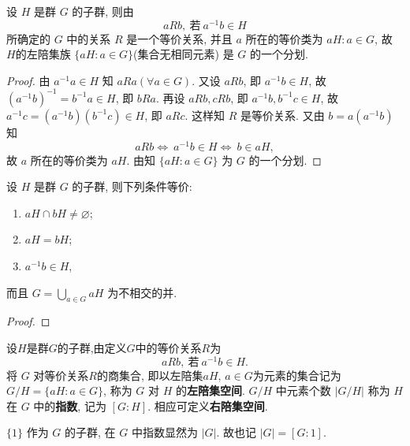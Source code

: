 \documentclass[../../main.tex]{subfiles}
\begin{document}
\begin{theorem}\label{theorem:抽象代数-定理 1.3.2}
设 \( H \) 是群 \( G \) 的子群, 则由
\[
aRb, \ \text{若} \ a^{-1}b \in H
\]
所确定的 \( G \) 中的关系 \( R \) 是一个等价关系, 并且 \( a \) 所在的等价类为 \( aH:a\in G \), 故 \( H \)的左陪集族 \( \{aH:a\in G\} \)(集合无相同元素) 是 \( G \) 的一个分划.
\end{theorem}
\begin{proof}
由 \( a^{-1}a \in H \) 知 \( aRa(\forall a \in G) \). 又设 \( aRb \), 即 \( a^{-1}b \in H \), 故 \( (a^{-1}b)^{-1} = b^{-1}a \in H \), 即 \( bRa \). 再设 \( aRb, cRb \), 即 \( a^{-1}b, b^{-1}c \in H \), 故 \( a^{-1}c = (a^{-1}b)(b^{-1}c) \in H \), 即 \( aRc \). 这样知 \( R \) 是等价关系. 又由 \( b = a(a^{-1}b) \) 知
\[
aRb \iff \ a^{-1}b \in H \iff \ b \in aH,
\]
故 \( a \) 所在的等价类为 \( aH \). 由知 \( \{aH:a\in G\} \) 为 \( G \) 的一个分划.
\end{proof}

\begin{corollary}\label{corollary:抽象代数-推论 1.3.3}
设 \( H \) 是群 \( G \) 的子群, 则下列条件等价:
\begin{enumerate}[(1)]
\item \( aH \cap bH \neq \varnothing \);

\item \( aH = bH \);

\item \( a^{-1}b \in H \),
\end{enumerate}
而且 \( G = \bigcup\limits_{a \in G} aH \) 为不相交的并.
\end{corollary}
\begin{proof}

\end{proof}

\begin{definition}
设$H$是群$G$的子群,由定义$G$中的等价关系$R$为
\[
aRb, \ \text{若} \ a^{-1}b \in H.
\]
将 \( G \) 对等价关系$R$的商集合, 即以左陪集$aH,\,a\in G$为元素的集合记为 \( G/H=\{aH:a\in G\} \), 称为 \( G \) 对 \( H \) 的\textbf{左陪集空间}. \( G/H \) 中元素个数 \( |G/H| \) 称为 \( H \) 在 \( G \) 中的\textbf{指数}, 记为 \( [G:H] \). 相应可定义\textbf{右陪集空间}.
\end{definition}
\begin{remark}
\(\{1\}\) 作为 \( G \) 的子群, 在 \( G \) 中指数显然为 \( |G| \). 故也记 \( |G| = [G: 1] \).
\end{remark}
\end{document}
